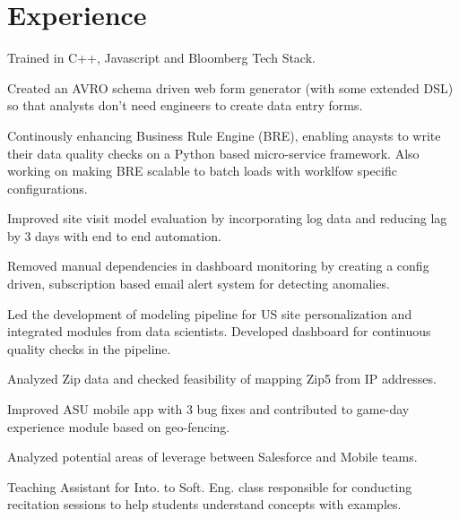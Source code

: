 \documentclass[]{deedy-resume-openfont}
\begin{document}
\hfill
\begin{minipage}[t]{0.66\textwidth} 
\hspace{+0.5mm}

\section{Experience}

\vspace{\topsep} %
\begin{tightemize}
\item Trained in C++, Javascript and Bloomberg Tech Stack.
\item Created an AVRO schema driven web form generator (with some extended DSL) so that analysts don't need engineers to create data entry forms.
\item Continously enhancing Business Rule Engine (BRE), enabling anaysts to write their data quality checks on a Python based micro-service framework. Also working on making BRE scalable to batch loads with worklfow specific configurations.
\end{tightemize}
\sectionsep

\vspace{\topsep} %
\begin{tightemize}
\item Improved site visit model evaluation by incorporating log data and reducing lag by 3 days with end to end automation.
\item Removed manual dependencies in dashboard monitoring by creating a config driven, subscription based email alert system for detecting anomalies.
\item Led the development of modeling pipeline for US site personalization and integrated modules from data scientists. Developed dashboard for continuous quality checks in the pipeline.
\item Analyzed Zip data and checked feasibility of mapping Zip5 from IP addresses.
\end{tightemize}
\sectionsep

\begin{tightemize}
\item Improved ASU mobile app with 3 bug fixes and contributed to game-day experience module based on geo-fencing.
\item Analyzed potential areas of leverage between Salesforce and Mobile teams.
\item Teaching Assistant for Into. to Soft. Eng. class responsible for conducting recitation sessions to help students understand concepts with examples.
\end{tightemize}
\sectionsep


\end{minipage}
\end{document}
